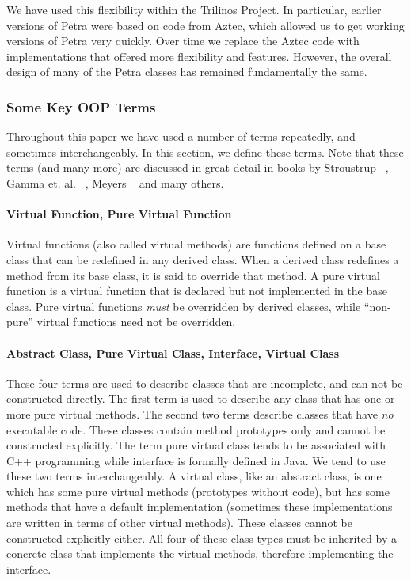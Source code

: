 \documentclass[12pt,relax]{SANDreport}
\begin{document}
We have used this flexibility within the Trilinos Project.  In particular, earlier versions
of Petra were based on code from Aztec, which allowed us to get working versions of Petra
very quickly.  Over time we replace the Aztec code with implementations that offered more
flexibility and features.  However, the overall design of many of the Petra classes has
remained fundamentally the same.

\subsubsection{Some Key OOP Terms}
Throughout this paper we have used a number of terms repeatedly, and sometimes
interchangeably. In this section, we define these terms. Note that these terms
(and many more) are discussed in great detail in books by
Stroustrup ~\cite{Stroustrup}, Gamma et. al. ~\cite{Gamma},
Meyers ~\cite{Meyers1,Meyers2} and many others.

\paragraph{Virtual Function, Pure Virtual Function}
Virtual functions (also called virtual methods) are functions defined on a
base class that can be redefined in any derived class. When a derived class
redefines a method from its base class, it is said to override that method.
A pure virtual function is a virtual function that is declared but not
implemented in the base class. Pure virtual functions {\it must} be overridden
by derived classes, while ``non-pure'' virtual functions need not be overridden.

\paragraph{Abstract Class, Pure Virtual Class, Interface, Virtual Class}  
These four terms are used to describe classes that are incomplete, and can not
be constructed directly.  The first term is used to describe any class that has
one or more pure virtual methods.  The second two terms describe classes that
have {\it no} executable code.  These classes contain method prototypes only
and cannot be constructed explicitly.  The term pure virtual class tends to be
associated with C++ programming while interface is formally defined in Java.
We tend to use these two terms interchangeably.  A virtual class, like an
abstract class, is one which has some pure virtual methods (prototypes without
code), but has some methods that have a default implementation (sometimes these
implementations are written in terms of other virtual methods).  These
classes cannot be constructed explicitly either.  All four of these class types
must be inherited by a concrete class that implements the virtual
methods, therefore implementing the interface.
\end{document}
